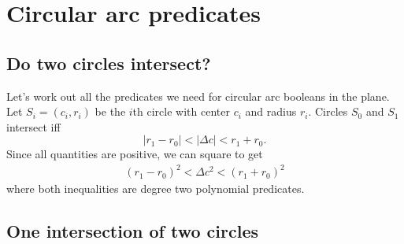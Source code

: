 \documentclass[11pt]{article}
\begin{document}
\section{Circular arc predicates}

\subsection{Do two circles intersect?}

Let's work out all the predicates we need for circular arc booleans in the plane.  Let $S_i = (c_i,r_i)$ be the $i$th
circle with center $c_i$ and radius $r_i$.  Circles $S_0$ and $S_1$ intersect iff
$$ | r_1 - r_0 | < |\Delta c| < r_1 + r_0. $$
Since all quantities are positive, we can square to get
\begin{align} \label{two-circles}
(r_1 - r_0)^2 < \Delta c^2 < (r_1 + r_0)^2
\end{align}
where both inequalities are degree two polynomial predicates.

\subsection{One intersection of two circles}
\end{document}
